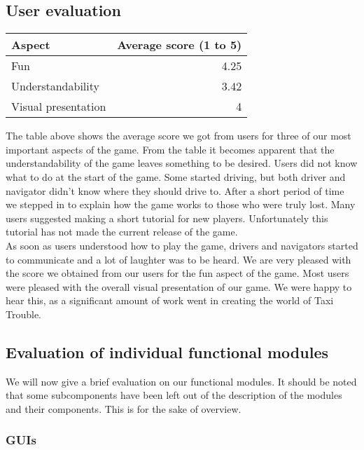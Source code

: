 \subsection{User evaluation}{
\begin{center}
\begin{tabular}{| l | r |}
	\hline
	Aspect & Average score (1 to 5) \\ \hline
	Fun & 4.25 \\ \hline
	Understandability  & 3.42 \\ \hline
	Visual presentation & 4\\ \hline
\end{tabular}
\end{center} 

The table above shows the average score we got from users for three of our most important aspects of the game. From the table it becomes apparent that the understandability  of the game leaves something to be desired. Users did not know what to do at the start of the game. Some started driving, but both driver and navigator didn't know where they should drive to. After a short period of time we stepped in to explain how the game works to those who were truly  lost. Many users suggested making a short tutorial for new players. Unfortunately this tutorial has not made the current release of the game.\\

As soon as users understood how to play the game, drivers and navigators started to communicate and a lot of laughter was to be heard. We are very pleased with the score we obtained from our users for the fun aspect of the game. Most users were pleased with the overall visual presentation of our game. We were happy to hear this, as a significant amount of work went in creating the world of Taxi Trouble.

\subsection{Evaluation of individual functional modules}

We will now give a brief evaluation on our functional modules. It should be noted that some subcomponents have been left out of the description of the modules and their components. This is for the sake of overview.

\subsubsection{GUIs}

}
